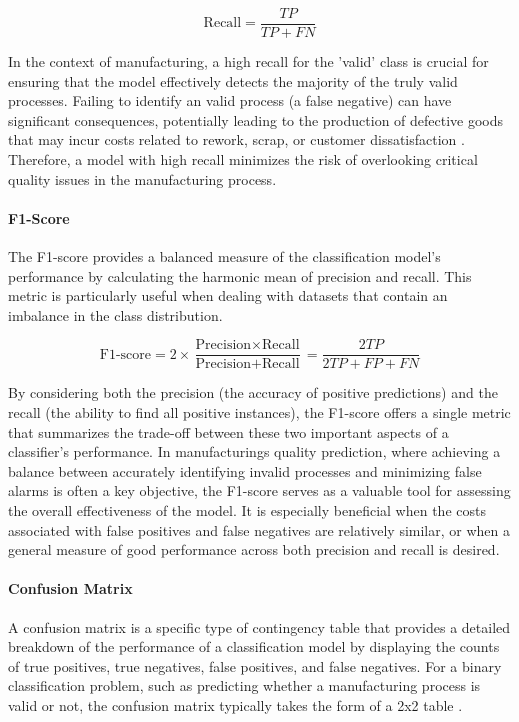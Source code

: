 \begin{equation}
  \label{eq:recall}
  \text{Recall} = \frac{TP}{TP + FN}
\end{equation}

In the context of manufacturing, a high recall for the 'valid' class is crucial for ensuring that the model effectively detects the majority of the truly valid processes. Failing to identify an valid process (a false negative) can have significant consequences, potentially leading to the production of defective goods that may incur costs related to rework, scrap, or customer dissatisfaction \autocite{kharitonov2022comparative}. Therefore, a model with high recall minimizes the risk of overlooking critical quality issues in the manufacturing process.

\paragraph{\textbf{F1-Score}}
The F1-score provides a balanced measure of the classification model's performance by calculating the harmonic mean of precision and recall. This metric is particularly useful when dealing with datasets that contain an imbalance in the class distribution.

\begin{equation}
  \label{eq:F1-score}
  \text{F1-score} = 2 \times \frac{\text{Precision} \times \text{Recall}}{\text{Precision} + \text{Recall}} = \frac{2TP}{2TP + FP + FN}
\end{equation}

By considering both the precision (the accuracy of positive predictions) and the recall (the ability to find all positive instances), the F1-score offers a single metric that summarizes the trade-off between these two important aspects of a classifier's performance. In manufacturings quality prediction, where achieving a balance between accurately identifying invalid processes and minimizing false alarms is often a key objective, the F1-score serves as a valuable tool for assessing the overall effectiveness of the model. It is especially beneficial when the costs associated with false positives and false negatives are relatively similar, or when a general measure of good performance across both precision and recall is desired.

\paragraph{\textbf{Confusion Matrix}}
A confusion matrix is a specific type of contingency table that provides a detailed breakdown of the performance of a classification model by displaying the counts of true positives, true negatives, false positives, and false negatives. For a binary classification problem, such as predicting whether a manufacturing process is valid or not, the confusion matrix typically takes the form of a 2x2 table \autocite{fahrmeir2016statistik}.


